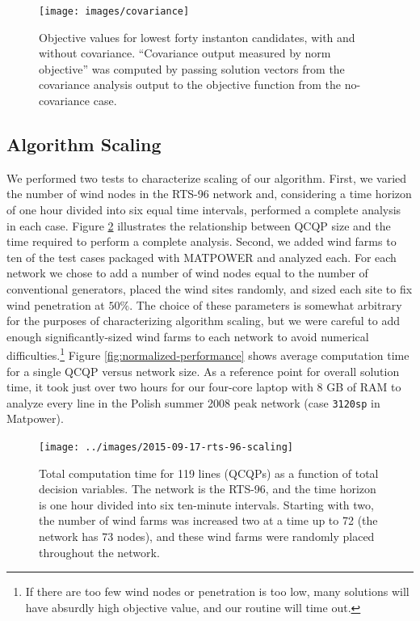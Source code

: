 \documentclass[journal,twoside]{IEEEtran}
\begin{document}
\begin{figure}
\centering
\texttt{[image: images/covariance]}
\caption{Objective values for lowest forty instanton candidates, with and without covariance. ``Covariance output measured by norm objective'' was computed by passing solution vectors from the covariance analysis output to the objective function from the no-covariance case.}
\label{fig:covariance}
\end{figure}

\subsection{Algorithm Scaling}
We performed two tests to characterize scaling of our algorithm. First, we varied the number of wind nodes in the RTS-96 network and, considering a time horizon of one hour divided into six equal time intervals, performed a complete analysis in each case. Figure \ref{fig:rts-96-scaling} illustrates the relationship between QCQP size and the time required to perform a complete analysis. Second, we added wind farms to ten of the test cases packaged with MATPOWER \cite{zimmerman2011} and analyzed each. For each network we chose to add a number of wind nodes equal to the number of conventional generators, placed the wind sites randomly, and sized each site to fix wind penetration at $50\%$. The choice of these parameters is somewhat arbitrary for the purposes of characterizing algorithm scaling, but we were careful to add enough significantly-sized wind farms to each network to avoid numerical difficulties.\footnote{If there are too few wind nodes or penetration is too low, many solutions will have absurdly high objective value, and our routine will time out.} Figure \ref{fig:normalized-performance} shows average computation time for a single QCQP versus network size. As a reference point for overall solution time, it took just over two hours for our four-core laptop with 8 GB of RAM to analyze every line in the Polish summer 2008 peak network (case \texttt{3120sp} in Matpower).

\begin{figure}
\centering
\texttt{[image: ../images/2015-09-17-rts-96-scaling]}
\caption{Total computation time for 119 lines (QCQPs) as a function of total decision variables. The network is the RTS-96, and the time horizon is one hour divided into six ten-minute intervals. Starting with two, the number of wind farms was increased two at a time up to 72 (the network has 73 nodes), and these wind farms were randomly placed throughout the network.}
\label{fig:rts-96-scaling}
\end{figure}
\end{document}
